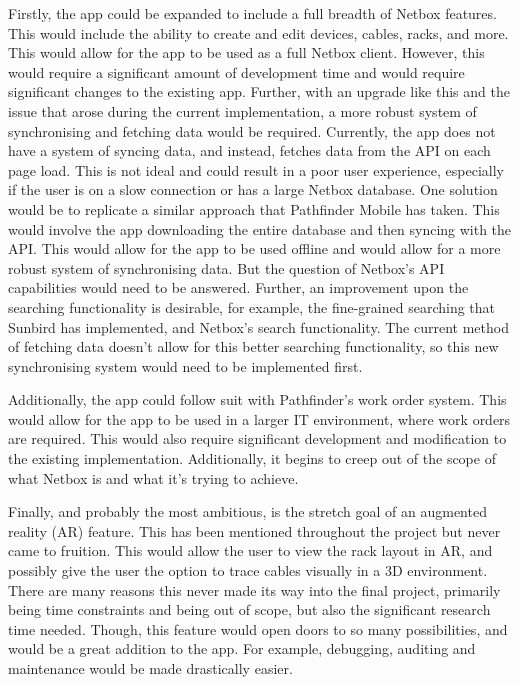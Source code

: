 \documentclass [11pt,a4paper]{article}
\begin{document}
Firstly, the app could be expanded to include a full breadth of Netbox features. This would include the ability to create and edit devices, cables, racks, and more. This would allow for the app to be used as a full Netbox client. However, this would require a significant amount of development time and would require significant changes to the existing app. Further, with an upgrade like this and the issue that arose during the current implementation, a more robust system of synchronising and fetching data would be required. Currently, the app does not have a system of syncing data, and instead, fetches data from the API on each page load. This is not ideal and could result in a poor user experience, especially if the user is on a slow connection or has a large Netbox database. One solution would be to replicate a similar approach that Pathfinder Mobile has taken. This would involve the app downloading the entire database and then syncing with the API. This would allow for the app to be used offline and would allow for a more robust system of synchronising data. But the question of Netbox's API capabilities would need to be answered. Further, an improvement upon the searching functionality is desirable, for example, the fine-grained searching that Sunbird has implemented, and Netbox's search functionality. The current method of fetching data doesn't allow for this better searching functionality, so this new synchronising system would need to be implemented first.

Additionally, the app could follow suit with Pathfinder's work order system. This would allow for the app to be used in a larger IT environment, where work orders are required. This would also require significant development and modification to the existing implementation. Additionally, it begins to creep out of the scope of what Netbox is and what it's trying to achieve.

Finally, and probably the most ambitious, is the stretch goal of an augmented reality (AR) feature. This has been mentioned throughout the project but never came to fruition. This would allow the user to view the rack layout in AR, and possibly give the user the option to trace cables visually in a 3D environment. There are many reasons this never made its way into the final project, primarily being time constraints and being out of scope, but also the significant research time needed. Though, this feature would open doors to so many possibilities, and would be a great addition to the app. For example, debugging, auditing and maintenance would be made drastically easier. 
\end{document}
